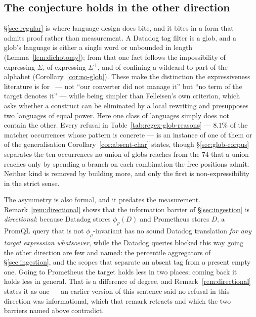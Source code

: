 \subsection{The conjecture holds in the other direction}

\S\ref{sec:regular} is where language design does bite, and it bites in a form that
admits proof rather than measurement. A Datadog tag filter is a glob, and a glob's
language is either a single word or unbounded in length
(Lemma~\ref{lem:dichotomy}); from that one fact follows the impossibility of expressing
$\Sigma$, of expressing $\Sigma^{+}$, and of confining a wildcard to part of the
alphabet (Corollary~\ref{cor:no-glob}). These make the distinction the expressiveness
literature is for~\citep{felleisen1991} --- not ``our converter did not manage it'' but
``no term of the target denotes it'' --- while being simpler than Felleisen's own
criterion, which asks whether a construct can be eliminated by a local rewriting and
presupposes two languages of equal power. Here one class of languages simply does not
contain the other. Every refusal in
Table~\ref{tab:regex-glob-reasons} --- $8.1\%$ of the matcher occurrences whose
pattern is concrete --- is an instance of one of them or of the generalisation
Corollary~\ref{cor:absent-char} states, though \S\ref{sec:glob-corpus}
separates the ten occurrences no union of globs reaches from the $74$ that a union
reaches only by spending a branch on each combination the free positions admit. Neither kind is removed by
building more, and only the first is non-expressibility in the strict sense.

The asymmetry is also formal, and it predates the measurement.
Remark~\ref{rem:directional} shows that the information barrier of
\S\ref{sec:ingestion} is \emph{directional}: because Datadog stores
$\phi_\rho(D)$ and Prometheus stores $D$, a PromQL query that is not
$\phi_\rho$-invariant has no sound Datadog translation \emph{for any target expression
whatsoever}, while the Datadog queries blocked this way going the other direction are
few and named: the percentile aggregators of \S\ref{sec:ingestion}, and the scopes that
separate an absent tag from a present empty one. Going to Prometheus the target holds
less in two places; coming back it holds less in general. That is a difference of degree,
and Remark~\ref{rem:directional} states it as one --- an earlier version of this sentence
said no refusal in this direction was informational, which that remark retracts and
which the two barriers named above contradict.

